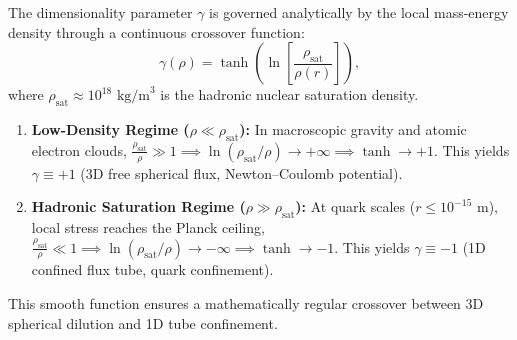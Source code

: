 \documentclass[11pt,a4paper]{article}
\begin{document}
The dimensionality parameter $\gamma$ is governed analytically by the local mass-energy density through a continuous crossover function:
\begin{equation}
    \gamma(\rho) = \tanh\left( \ln\left[ \frac{\rho_{\mathrm{sat}}}{\rho(r)} \right] \right),
    \label{eq:gamma_surekli_gecis_paper3}
\end{equation}
where $\rho_{\mathrm{sat}} \approx 10^{18}\text{ kg/m}^3$ is the hadronic nuclear saturation density.
\begin{enumerate}
    \item \textbf{Low-Density Regime ($\rho \ll \rho_{\mathrm{sat}}$):} In macroscopic gravity and atomic electron clouds, $\frac{\rho_{\mathrm{sat}}}{\rho} \gg 1 \implies \ln(\rho_{\mathrm{sat}}/\rho) \to +\infty \implies \tanh \to +1$. This yields $\gamma \equiv +1$ (3D free spherical flux, Newton--Coulomb potential).
    \item \textbf{Hadronic Saturation Regime ($\rho \gg \rho_{\mathrm{sat}}$):} At quark scales ($r \le 10^{-15}\text{ m}$), local stress reaches the Planck ceiling, $\frac{\rho_{\mathrm{sat}}}{\rho} \ll 1 \implies \ln(\rho_{\mathrm{sat}}/\rho) \to -\infty \implies \tanh \to -1$. This yields $\gamma \equiv -1$ (1D confined flux tube, quark confinement).
\end{enumerate}
This smooth function ensures a mathematically regular crossover between 3D spherical dilution and 1D tube confinement.
\end{document}
